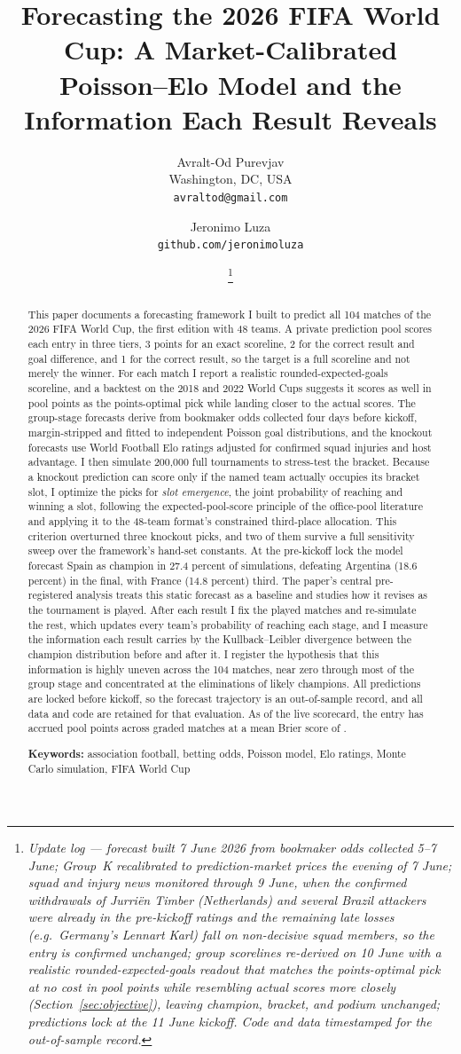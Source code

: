 \documentclass[11pt,letterpaper]{article}
\title{\textbf{Forecasting the 2026 FIFA World Cup: A Market-Calibrated Poisson--Elo Model and the Information Each Result Reveals}}
\author{Avralt-Od Purevjav\\ \small Washington, DC, USA \\ \small \texttt{avraltod@gmail.com}
\and Jeronimo Luza\\ \small \texttt{github.com/jeronimoluza}}
\date{\liveVersionLine\thanks{\itshape Update log --- forecast built 7 June 2026 from bookmaker odds collected 5--7 June; Group~K recalibrated to prediction-market prices the evening of 7 June; squad and injury news monitored through 9 June, when the confirmed withdrawals of Jurri\"en Timber (Netherlands) and several Brazil attackers were already in the pre-kickoff ratings and the remaining late losses (e.g.\ Germany's Lennart Karl) fall on non-decisive squad members, so the entry is confirmed unchanged; group scorelines re-derived on 10 June with a realistic rounded-expected-goals readout that matches the points-optimal pick at no cost in pool points while resembling actual scores more closely (Section~\ref{sec:objective}), leaving champion, bracket, and podium unchanged; predictions lock at the 11 June kickoff. Code and data timestamped for the out-of-sample record.\liveUpdateLog{}}}
\begin{document}
\maketitle

\begin{abstract}
\noindent This paper documents a forecasting framework I built to predict all 104 matches of the 2026 FIFA World Cup, the first edition with 48 teams. A private prediction pool scores each entry in three tiers, 3 points for an exact scoreline, 2 for the correct result and goal difference, and 1 for the correct result, so the target is a full scoreline and not merely the winner. For each match I report a realistic rounded-expected-goals scoreline, and a backtest on the 2018 and 2022 World Cups suggests it scores as well in pool points as the points-optimal pick while landing closer to the actual scores. The group-stage forecasts derive from bookmaker odds collected four days before kickoff, margin-stripped and fitted to independent Poisson goal distributions, and the knockout forecasts use World Football Elo ratings adjusted for confirmed squad injuries and host advantage. I then simulate 200{,}000 full tournaments to stress-test the bracket. Because a knockout prediction can score only if the named team actually occupies its bracket slot, I optimize the picks for \emph{slot emergence}, the joint probability of reaching and winning a slot, following the expected-pool-score principle of the office-pool literature and applying it to the 48-team format's constrained third-place allocation. This criterion overturned three knockout picks, and two of them survive a full sensitivity sweep over the framework's hand-set constants. At the pre-kickoff lock the model forecast Spain as champion in 27.4 percent of simulations, defeating Argentina (18.6 percent) in the final, with France (14.8 percent) third.  The paper's central pre-registered analysis treats this static forecast as a baseline and studies how it revises as the tournament is played. After each result I fix the played matches and re-simulate the rest, which updates every team's probability of reaching each stage, and I measure the information each result carries by the Kullback--Leibler divergence between the champion distribution before and after it. I register the hypothesis that this information is highly uneven across the 104 matches, near zero through most of the group stage and concentrated at the eliminations of likely champions. All predictions are locked before kickoff, so the forecast trajectory is an out-of-sample record, and all data and code are retained for that evaluation. As of the live scorecard, the entry has accrued \liveCumPoints{} pool points across \liveDocumented{} graded matches at a mean Brier score of \liveMeanBrier{}.

\medskip
\noindent\textbf{Keywords:} association football, betting odds, Poisson model, Elo ratings, Monte Carlo simulation, FIFA World Cup
\end{abstract}
\end{document}
